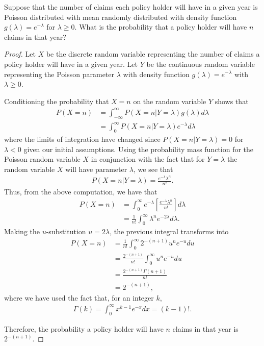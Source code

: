 \begin{problem}{1}
  Suppose that the number of claims each policy holder will have in a given year is
  Poisson distributed with mean randomly distributed with density function $g(\lambda) = e^{-\lambda}$
  for $\lambda \geq 0$.
  What is the probability that a policy holder will have $n$ claims in that year?
\end{problem}

\begin{proof}
  Let $X$ be the discrete random variable representing the number of claims
  a policy holder will have in a given year. Let $Y$ be the continuous random
  variable representing the Poisson parameter $\lambda$ with density function
  $g(\lambda) = e^{-\lambda}$ with $\lambda \geq 0$.

  Conditioning the probability that $X = n$ on the random variable $Y$ shows
  that
  \begin{align*}
    P(X = n) &= \int_{-\infty}^{\infty} P(X=n | Y=\lambda) g(\lambda) d \lambda \\
    &= \int_{0}^{\infty} P(X=n | Y=\lambda) e^{-\lambda} d \lambda
  \end{align*}
  where the limits of integration have changed since $P(X=n | Y=\lambda) = 0$ for
  $\lambda < 0$ given our initial assumptions. Using the probability mass function
  for the Poisson random variable $X$ in conjunction with the fact that for
  $Y=\lambda$ the random variable $X$ will have parameter $\lambda$,
  we see that
  \begin{align*}
    P(X=n | Y=\lambda) = \frac{e^{-\lambda}\lambda^n}{n!}.
  \end{align*}
  Thus, from the above computation, we have that
  \begin{align*}
    P(X = n) &= \int_{0}^{\infty}  e^{-\lambda} \left[\frac{e^{-\lambda}\lambda^n}{n!}\right] d \lambda \\
    &= \frac{1}{n!}\int_{0}^{\infty} \lambda^n e^{-2\lambda} d\lambda.
  \end{align*}
  Making the $u$-substitution $u=2\lambda$, the previous integral transforms into
  \begin{align*}
    P(X = n) &= \frac{1}{n!}\int_{0}^{\infty} 2^{-(n+1)}u^{n} e^{-u} du \\
    &= \frac{2^{-(n+1)}}{n!}\int_{0}^{\infty} u^{n} e^{-u} du \\
    &= \frac{2^{-(n+1)}\Gamma(n+1)}{n!} \\
    &= 2^{-(n+1)},
 \end{align*}
 where we have used the fact that, for an integer $k$,
 \begin{align*}
   \Gamma(k) = \int_0^\infty x^{k-1} e^{-x} dx = (k-1)!.
 \end{align*}

 Therefore, the probability a policy holder will have $n$ claims in that year is $2^{-(n+1)}$.
\end{proof}
\newpage
